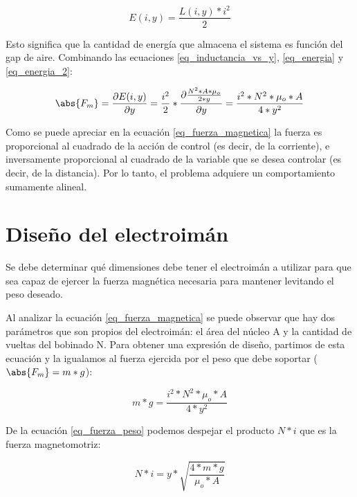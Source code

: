 \begin{equation}\label{eq_energia_2}
	E(i,y)=\frac{L(i,y)*i^{2}}{2}
\end{equation}

\noindent Esto significa que la cantidad de energía que almacena el sistema es función del gap de aire. Combinando las ecuaciones \ref{eq_inductancia_vs_y}, \ref{eq_energia} y \ref{eq_energia_2}:

\begin{equation}\label{eq_fuerza_magnetica}
	\abs{F_{m}}=\frac{\partial{E(i,y)}}{\partial{y}}=\frac{i^{2}}{2}*\frac{\partial{\frac{{N^{2}*A*\mu_{o}}}{2*y}}}{\partial{y}}=\frac{i^{2}*N^{2}*\mu_{o}*A}{4*y^{2}}
\end{equation}

\noindent Como se puede apreciar en la ecuación \ref{eq_fuerza_magnetica} la fuerza es proporcional al cuadrado de la acción de control (es decir, de la corriente), e inversamente proporcional al cuadrado de la variable que se desea controlar (es decir, de la distancia). Por lo tanto, el problema adquiere un comportamiento sumamente alineal.

\section{Diseño del electroimán}

\noindent Se debe determinar qué dimensiones debe tener el electroimán a utilizar para que sea capaz de ejercer la fuerza magnética necesaria para mantener levitando el peso deseado.

\noindent Al analizar la ecuación \ref{eq_fuerza_magnetica} se puede observar que hay dos parámetros que son propios del electroimán: el área del núcleo A y la cantidad de vueltas del bobinado N. Para obtener una expresión de diseño, partimos de esta ecuación y la igualamos al fuerza ejercida por el peso que debe soportar ($\abs{F_{m}}=m*g$):

\begin{equation}\label{eq_fuerza_peso}
	m*g=\frac{i^{2}*N^{2}*\mu_{o}*A}{4*y^{2}}
\end{equation}

\noindent De la ecuación \ref{eq_fuerza_peso} podemos despejar el producto $N*i$ que es la fuerza magnetomotriz:

\begin{equation} \label{eq_n_por_i}
	N*i=y*\sqrt{\frac{4*m*g}{\mu_{o}*A}}
\end{equation}

